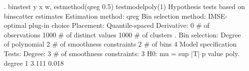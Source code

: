 . binstest y x w, estmethod(qreg 0.5) testmodelpoly(1)
{\smallskip}
Hypothesis tests based on binscatter estimates
Estimation method: qreg
Bin selection method: IMSE-optimal plug-in choice
Placement: Quantile-spaced
Derivative: 0
{\smallskip}
\# of observations             {\VBAR}    1000
\# of distinct values          {\VBAR}    1000
\# of clusters                 {\VBAR}       .
Bin selection:                {\VBAR} 
         Degree of polynomial {\VBAR}       2
  \# of smoothness constraints {\VBAR}       2
                    \# of bins {\VBAR}       4
{\smallskip}
Model specification Tests:
Degree: 3     \# of smoothness constraints: 3
{\smallskip}
H0: mu =           {\VBAR} sup |T|           p value
poly. degree  1    {\VBAR}   3.111             0.018
